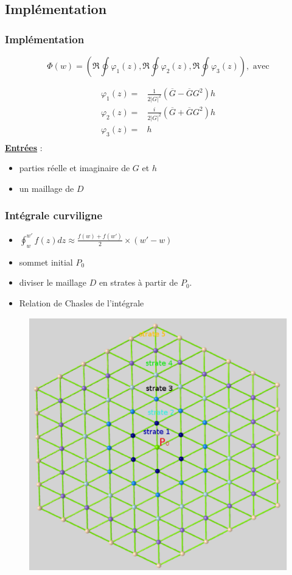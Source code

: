 \documentclass{beamer}
\newcommand{\gs}[1]{\textbf{\underline{#1}}}
\begin{document}
\subsection{Implémentation}

\begin{frame}
\frametitle{Implémentation}
$$\Phi(w) = \left(\Re \oint \varphi_1(z), \Re \oint \varphi_2(z), \Re \oint \varphi_3(z)\right), \text{ avec}$$

$$\begin{array}{cc}
\varphi_1(z) = & \frac{1}{2|G|^2}(\overline{G}-\overline{G}G^2)h\\
\varphi_2(z) = & \frac{i}{2|G|^2}(\overline{G}+\overline{G}G^2)h\\
\varphi_3(z) = & h\\
\end{array}
$$
\gs{Entrées} : \\
\begin{itemize}
\item parties réelle et imaginaire de $G$ et $h$
\item un maillage de $D$
\end{itemize}
\end{frame}

\begin{frame}
\frametitle{Intégrale curviligne}
\begin{itemize}
\item $\oint_w^{w'}f(z)dz \approx \frac{f(w)+f(w')}{2}\times (w'-w)$
\item sommet initial $P_0$
\item diviser le maillage $D$ en strates à partir de $P_0$.
\item Relation de Chasles de l'intégrale
\end{itemize}
\begin{figure}[h!]
      \centering 
      \includegraphics[scale=0.2]{strates.eps}
\end{figure}
\end{frame}
\end{document}
